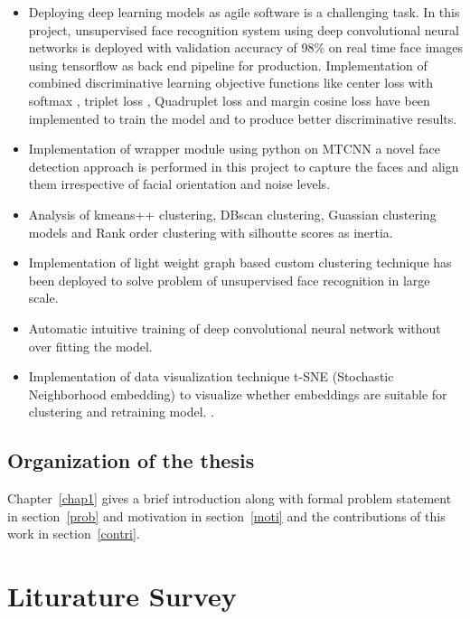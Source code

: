 \documentclass[a4paper,12pt, twoside]{NITKReport}
\begin{document}
\begin{itemize}
\item Deploying deep learning models as agile software is a challenging task. In this project, unsupervised face recognition system using deep convolutional neural networks is deployed with validation accuracy of 98\% on real time face images using tensorflow as back end pipeline for production. Implementation of combined discriminative learning objective functions like center loss with softmax \cite{wen2016discriminative}, triplet loss \cite{schroff2015facenet}, Quadruplet loss \cite{chen2017beyond} and margin cosine loss\cite{DBLP:journals/corr/abs-1801-09414} have been implemented to train the model and to produce better discriminative results.
\item Implementation of wrapper module using python on MTCNN a novel face detection approach is performed in this project to capture the faces and align them irrespective of facial orientation and noise levels. \cite{xiang2017joint}
\item Analysis of kmeans++ clustering, DBscan clustering, Guassian clustering models and Rank order clustering with silhoutte scores as inertia.
\item Implementation of light weight graph based custom clustering technique has been deployed to solve problem of unsupervised face recognition in large scale. 
\item Automatic intuitive training of deep convolutional neural network without over fitting the model. \cite{DBLP:journals/corr/CogswellAGZB15} 
\item Implementation of data visualization technique t-SNE (Stochastic Neighborhood embedding) to visualize whether embeddings are suitable for clustering and retraining model. \cite{maaten2008visualizing}. 

\end{itemize}
	
\section{Organization of the thesis}
	Chapter~\ref{chap1} gives a brief introduction along with formal problem statement in section~\ref{prob} and motivation in section~\ref{moti} and the contributions of this work in section~\ref{contri}.
	
\newpage
\chapter{Liturature Survey}
\label{chap2}
\end{document}
